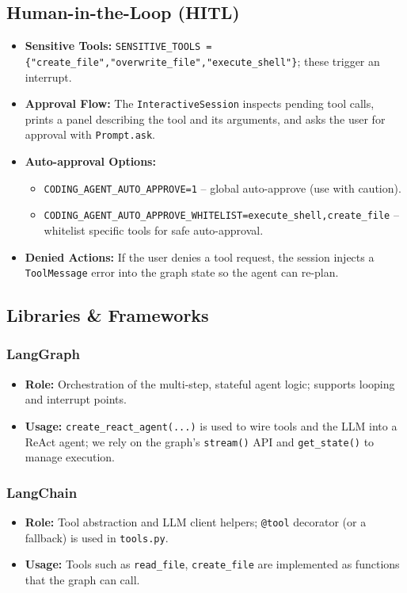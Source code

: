 \documentclass[12pt, a4paper]{article}
\begin{document}
\subsection{Human-in-the-Loop (HITL)}
\begin{itemize}
  \item \textbf{Sensitive Tools:} \texttt{SENSITIVE\_TOOLS = \{"create\_file","overwrite\_file","execute\_shell"\}}; these trigger an interrupt.
  \item \textbf{Approval Flow:} The \texttt{InteractiveSession} inspects pending tool calls, prints a panel describing the tool and its arguments, and asks the user for approval with \texttt{Prompt.ask}.
  \item \textbf{Auto-approval Options:}
    \begin{itemize}
      \item \texttt{CODING\_AGENT\_AUTO\_APPROVE=1} -- global auto-approve (use with caution).
      \item \texttt{CODING\_AGENT\_AUTO\_APPROVE\_WHITELIST=execute\_shell,create\_file} -- whitelist specific tools for safe auto-approval.
    \end{itemize}
  \item \textbf{Denied Actions:} If the user denies a tool request, the session injects a \texttt{ToolMessage} error into the graph state so the agent can re-plan.
\end{itemize}

\subsection{Libraries \& Frameworks}
\subsubsection{LangGraph}
\begin{itemize}
  \item \textbf{Role:} Orchestration of the multi-step, stateful agent logic; supports looping and interrupt points.
  \item \textbf{Usage:} \texttt{create\_react\_agent(...)} is used to wire tools and the LLM into a ReAct agent; we rely on the graph's \texttt{stream()} API and \texttt{get\_state()} to manage execution.
\end{itemize}

\subsubsection{LangChain}
\begin{itemize}
  \item \textbf{Role:} Tool abstraction and LLM client helpers; \texttt{@tool} decorator (or a fallback) is used in \texttt{tools.py}.
  \item \textbf{Usage:} Tools such as \texttt{read\_file}, \texttt{create\_file} are implemented as functions that the graph can call.
\end{itemize}
\end{document}
